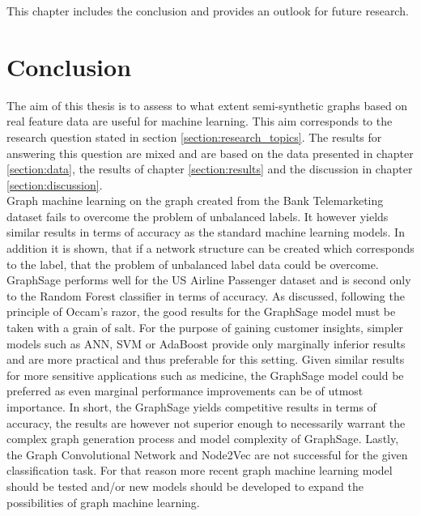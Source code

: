 
  This chapter includes the conclusion and provides an outlook for future
  research.

  \section{Conclusion}
  \label{section:conclusion}

  The aim of this thesis is to assess to what extent semi-synthetic graphs based 
  on real feature data are useful for machine learning. This aim corresponds to
  the research question stated in section \ref{section:research_topics}. The
  results for answering this question are mixed and are based on the data
  presented in chapter \ref{section:data}, the results of chapter
  \ref{section:results} and the discussion in chapter \ref{section:discussion}.
  \\

  \noindent Graph machine learning on the graph created from the Bank 
  Telemarketing dataset fails to overcome the problem of unbalanced labels. It 
  however yields similar results in terms of accuracy as the standard machine 
  learning models. In addition it is shown, that if a network structure can be 
  created which corresponds to the label, that the problem of unbalanced label 
  data could be overcome. \\

  \noindent GraphSage performs well for the US Airline Passenger dataset and
  is second only to the Random Forest classifier in terms of accuracy. As
  discussed, following the principle of Occam's razor, the good results for the
  GraphSage model must be taken with a grain of salt. For the purpose of
  gaining customer insights, simpler models such as ANN, SVM or AdaBoost provide
  only marginally inferior results and are more practical and thus preferable
  for this setting. Given similar results for more sensitive applications such
  as medicine, the GraphSage model could be preferred as even marginal
  performance improvements can be of utmost importance. In short, the GraphSage
  yields competitive results in terms of accuracy, the results are however not
  superior enough to necessarily warrant the complex graph generation process
  and model complexity of GraphSage. Lastly, the Graph Convolutional Network and
  Node2Vec are not successful for the given classification task. For that
  reason more recent graph machine learning model should be tested and/or new 
  models should be developed to expand the possibilities of graph machine 
  learning.\\

